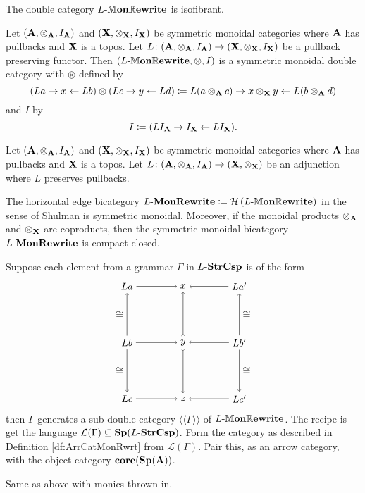 \documentclass{amsart}
\begin{document}
\begin{thm} \label{thm_mon-rewrite-isofibrant}
	The double category $ L \text{-} \mathbb{M}\mathbf{on}\mathbb{R}\mathbf{ewrite} $ is isofibrant.
\end{thm}

\begin{thm} \label{thm_mon-rewrite-dble-cat-smc}
	Let $ (\mathbf{A}, \otimes_{ \mathbf{A} }, I_{ \mathbf{A} }) $ and $ (\mathbf{X}, \otimes_{\mathbf{X}}, I_{\mathbf{X}}) $ be symmetric monoidal categories where $ \mathbf{A} $ has pullbacks and $ \mathbf{X} $ is a topos. Let $ L \colon (\mathbf{A}, \otimes_{ \mathbf{A} }, I_{ \mathbf{A} }) \to (\mathbf{X}, \otimes_{\mathbf{X}}, I_{\mathbf{X}}) $ be a pullback preserving functor. Then $ (L \text{-} \mathbb{M}\mathbf{on}\mathbb{R}\mathbf{ewrite} , \otimes , I) $ is a symmetric monoidal double category with $ \otimes $ defined by
	\[
	\left( L a \to x \gets L b \right) \otimes
	\left( L c \to y \gets L d	\right) \coloneqq
	L (a \otimes_{\mathbf{A}} c) \to 
	x \otimes_{\mathbf{X}} y \gets L (b \otimes_{\mathbf{A}} d)
	\]
	and $ I $ by
	\[
	I \coloneqq ( L I_{\mathbf{A}} \to I_{\mathbf{X}} \gets L I_{\mathbf{X}} ).
	\]
\end{thm}

\begin{thm} \label{thm_mon-rewrite-cat-compact-closed}
	Let $ (\mathbf{A}, \otimes_{ \mathbf{A} }, I_{ \mathbf{A} }) $ and $ (\mathbf{X}, \otimes_{\mathbf{X}}, I_{\mathbf{X}}) $ be symmetric monoidal categories where $ \mathbf{A} $ has pullbacks and $ \mathbf{X} $ is a topos. Let $ L \colon (\mathbf{A}, \otimes_{ \mathbf{A} }, I_{ \mathbf{A} }) \to (\mathbf{X}, \otimes_{\mathbf{X}}) $ be an adjunction where $ L $ preserves pullbacks.
	
	The horizontal edge bicategory $ L \text{-} \mathbf{MonRewrite} \coloneqq  \mathcal{H} \left( L \text{-} \mathbb{M}\mathbf{on}\mathbb{R}\mathbf{ewrite} \right) $ in the sense of Shulman is symmetric monoidal.  Moreover, if the monoidal products $ \otimes_{\mathbf{A}} $ and $ \otimes_{\mathbf{X}} $ are coproducts, then the symmetric monoidal bicategory $ L \text{-} \mathbf{MonRewrite} $ is compact closed.
\end{thm}


\begin{thm}
	Suppose each element from a grammar $ \Gamma $ in $ L \text{-} \mathbf{StrCsp} $ is of the form 
	\[
	\begin{tikzpicture}
	\node (a) at (-1,1) {$ L a $};
	\node (x) at (1,1) {$ x $};
	\node (a') at (3,1) {$ L a' $};
	\node (b) at (-1,-1) {$ L b $};
	\node (y) at (1,-1) {$ y $};
	\node (b') at (3,-1) {$ L b' $};
	\node (c) at (-1,-3) {$ L c $};
	\node (z) at (1,-3) {$ z $};
	\node (c') at (3,-3) {$ L c' $};
	\draw [->] (a) to (x);
	\draw [->] (a') to (x);
	\draw [->] (b) to (y);
	\draw [->] (b') to (y);
	\draw [->] (c) to (z);
	\draw [->] (c') to (z);
	\draw [->] (b) to node [left] {$ \cong $} (a);
	\draw [->] (b) to node [left] {$ \cong $} (c);
	\draw [>->] (y) to (x);
	\draw [>->] (y) to (z);
	\draw [->] (b') to node [right] {$ \cong $} (a');
	\draw [->] (b') to node [right] {$ \cong $} (c');
	\end{tikzpicture}
	\]
	then $ \Gamma $ generates a sub-double category $ \langle \langle \Gamma \rangle \rangle $ of $ L \text{-} \mathbb{M}\mathbf{on}\mathbb{R}\mathbf{ewrite} $.  The recipe is get the language $ \mathcal{L}(\Gamma)  \subseteq \mathbf{Sp}(L \text{-} \mathbf{StrCsp}) $. Form the category as described in Definition \ref{df:ArrCatMonRwrt} from $ \mathcal{L}(\Gamma) $. Pair this, as an arrow category, with the object category $ \mathbf{core}(\mathbf{Sp}(\mathbf{A})) $.
\end{thm}

\begin{thm}
	Same as above with monics thrown in.
\end{thm}
\end{document}
